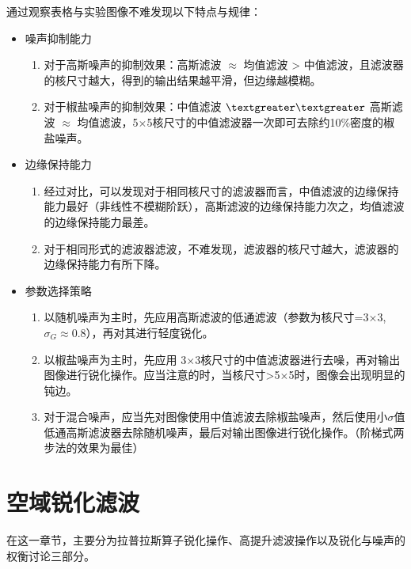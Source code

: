 \documentclass[11pt]{article}
\begin{document}
    通过观察表格与实验图像不难发现以下特点与规律：
    \begin{itemize}
    	\item 噪声抑制能力
    	\begin{enumerate}
    		\item 对于高斯噪声的抑制效果：高斯滤波 $\approx$ 均值滤波 > 中值滤波，且滤波器的核尺寸越大，得到的输出结果越平滑，但边缘越模糊。
    		\item 对于椒盐噪声的抑制效果：中值滤波 $\textgreater\textgreater$ 高斯滤波 $\approx$ 均值滤波，5×5核尺寸的中值滤波器一次即可去除约10\%密度的椒盐噪声。
    	\end{enumerate}
    	\item 边缘保持能力
    	\begin{enumerate}
    		\item 经过对比，可以发现对于相同核尺寸的滤波器而言，中值滤波的边缘保持能力最好（非线性不模糊阶跃），高斯滤波的边缘保持能力次之，均值滤波的边缘保持能力最差。
    		\item 对于相同形式的滤波器滤波，不难发现，滤波器的核尺寸越大，滤波器的边缘保持能力有所下降。
    	\end{enumerate}
    	\item 参数选择策略
    	\begin{enumerate}
    		\item 以随机噪声为主时，先应用高斯滤波的低通滤波（参数为核尺寸=3×3, $\sigma_{G}\approx0.8$），再对其进行轻度锐化。
    		\item 以椒盐噪声为主时，先应用 3×3核尺寸的中值滤波器进行去噪，再对输出图像进行锐化操作。应当注意的时，当核尺寸>5$\times$5时，图像会出现明显的钝边。
    		\item 对于混合噪声，应当先对图像使用中值滤波去除椒盐噪声，然后使用小$\sigma$值低通高斯滤波器去除随机噪声，最后对输出图像进行锐化操作。（阶梯式两步法的效果为最佳）
    	\end{enumerate}
    \end{itemize}
    
    \section{空域锐化滤波}
    在这一章节，主要分为拉普拉斯算子锐化操作、高提升滤波操作以及锐化与噪声的权衡讨论三部分。
\end{document}
